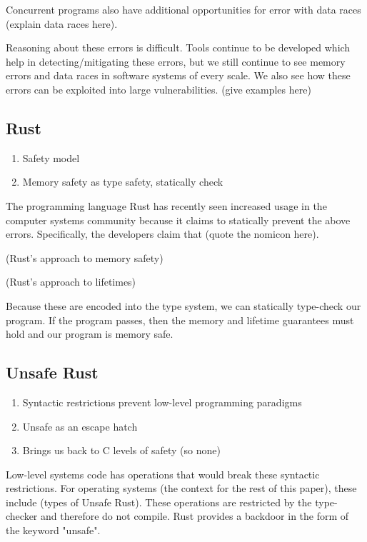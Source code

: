 \documentclass{article}
\begin{document}
Concurrent programs also have additional opportunities for error with data races (explain data races here).

Reasoning about these errors is difficult. Tools continue to be developed which help in detecting/mitigating these errors, but we still continue to see memory errors and data races in software systems of every scale. We also see how these errors can be exploited into large vulnerabilities. (give examples here)

\subsection{Rust}
\begin{enumerate}
    \item Safety model
    \item Memory safety as type safety, statically check
\end{enumerate}

The programming language Rust has recently seen increased usage in the computer systems community because it claims to statically prevent the above errors. Specifically, the developers claim that (quote the nomicon here).

(Rust's approach to memory safety)

(Rust's approach to lifetimes)

Because these are encoded into the type system, we can statically type-check our program. If the program passes, then the memory and lifetime guarantees must hold and our program is memory safe.

\subsection{Unsafe Rust}
\begin{enumerate}
    \item Syntactic restrictions prevent low-level programming paradigms
    \item Unsafe as an escape hatch
    \item Brings us back to C levels of safety (so none)
\end{enumerate}

Low-level systems code has operations that would break these syntactic restrictions. For operating systems (the context for the rest of this paper), these include (types of Unsafe Rust). These operations are restricted by the type-checker and therefore do not compile. Rust provides a backdoor in the form of the keyword "unsafe".
\end{document}
